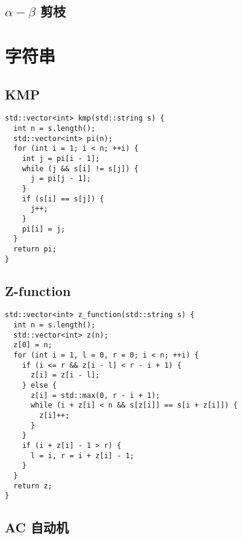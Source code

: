 \documentclass[a4paper,11pt,twoside,fontset = fandol,UTF8]{ctexbook} %
\begin{document}
\section{$\alpha-\beta$ 剪枝}


\chapter{字符串}

\section{KMP}

\begin{lstlisting}
std::vector<int> kmp(std::string s) {
  int n = s.length();
  std::vector<int> pi(n);
  for (int i = 1; i < n; ++i) {
    int j = pi[i - 1];
    while (j && s[i] != s[j]) {
      j = pi[j - 1];
    }
    if (s[i] == s[j]) {
      j++;
    }
    pi[i] = j;
  }
  return pi;
}
\end{lstlisting}

\section{Z-function}

\begin{lstlisting}
std::vector<int> z_function(std::string s) {
  int n = s.length();
  std::vector<int> z(n);
  z[0] = n;
  for (int i = 1, l = 0, r = 0; i < n; ++i) {
    if (i <= r && z[i - l] < r - i + 1) {
      z[i] = z[i - l];
    } else {
      z[i] = std::max(0, r - i + 1);
      while (i + z[i] < n && s[z[i]] == s[i + z[i]]) {
        z[i]++;
      }
    }
    if (i + z[i] - 1 > r) {
      l = i, r = i + z[i] - 1;
    }
  }
  return z;
}
\end{lstlisting}

\section{AC 自动机}
\end{document}
